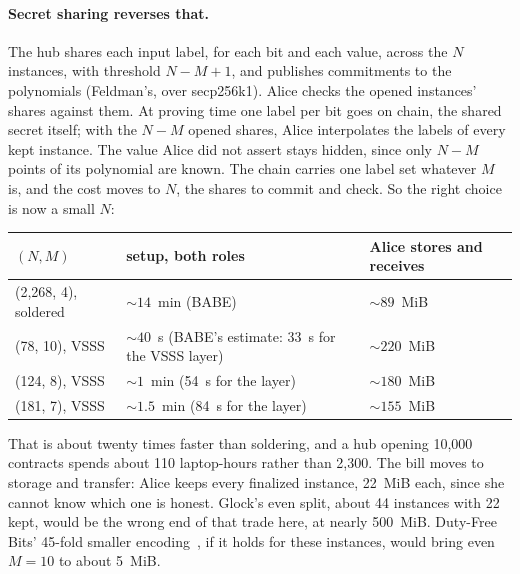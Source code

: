 \documentclass[11pt]{article}
\begin{document}
\paragraph{Secret sharing reverses that.} The hub shares each input
label, for each bit and each value, across the $N$ instances, with
threshold $N - M + 1$, and publishes commitments to the polynomials
(Feldman's, over secp256k1). Alice checks the opened instances' shares
against them. At proving time one label per bit goes on chain, the
shared secret itself; with the $N - M$ opened shares, Alice
interpolates the labels of every kept instance. The value Alice did not
assert stays hidden, since only $N - M$ points of its polynomial are
known. The chain carries one label set whatever $M$ is, and the cost
moves to $N$, the shares to commit and check. So the right choice is
now a small $N$:
\begin{center}
\small
\begin{tabularx}{\linewidth}{>{\raggedright\arraybackslash}p{30mm}LL}
\toprule
$(N, M)$ & setup, both roles & Alice stores and receives \\
\midrule
(2,268, 4), soldered & ${\sim}14$~min (BABE) & ${\sim}89$~MiB \\
(78, 10), VSSS & ${\sim}40$~s (BABE's estimate: 33~s for the VSSS layer) & ${\sim}220$~MiB \\
(124, 8), VSSS & ${\sim}1$~min (54~s for the layer) & ${\sim}180$~MiB \\
(181, 7), VSSS & ${\sim}1.5$~min (84~s for the layer) & ${\sim}155$~MiB \\
\bottomrule
\end{tabularx}
\end{center}
That is about twenty times faster than soldering, and a hub opening
10,000 contracts spends about 110 laptop-hours rather than 2,300. The
bill moves to storage and transfer: Alice keeps every finalized instance,
22~MiB each, since she cannot know which one is honest. Glock's even
split, about 44 instances with 22 kept, would be the wrong end of that
trade here, at nearly 500~MiB. Duty-Free Bits' 45-fold smaller
encoding~\cite{dutyfree}, if it holds for these instances, would bring
even $M = 10$ to about 5~MiB.
\end{document}
